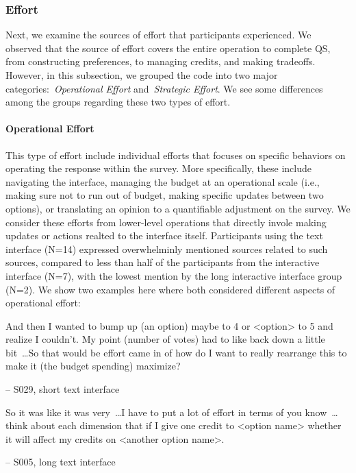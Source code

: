 
\subsubsection{Effort}
Next, we examine the sources of effort that participants experienced. We observed that the source of effort covers the entire operation to complete QS, from constructing preferences, to managing credits, and making tradeoffs. However, in this subsection, we grouped the code into two major categories:~\textit{Operational Effort} and~\textit{Strategic Effort}. We see some differences among the groups regarding these two types of effort.

\paragraph{Operational Effort} This type of effort include individual efforts that focuses on specific behaviors on operating the response within the survey. More specifically, these include navigating the interface, managing the budget at an operational scale (i.e., making sure not to run out of budget, making specific updates between two options), or translating an opinion to a quantifiable adjustment on the survey. We consider these efforts from lower-level operations that directly invole making updates or actions realted to the interface itself. Participants using the text interface (N=14) expressed overwhelminly mentioned sources related to such sources, compared to less than half of the participants from the interactive interface (N=7), with the lowest mention by the long interactive interface group (N=2). We show two examples here where both considered different aspects of operational effort:

\begin{displayquote}
And then I wanted to bump up (an option) maybe to 4 or <option> to 5 and realize I couldn't. My point (number of votes) had to like back down a little bit~\ldots So that would be effort came in of how do I want to really rearrange this to make it (the budget spending) maximize?

\noindent \hfill -- S029, short text interface
\end{displayquote}

\begin{displayquote}
So it was like it was very~\ldots I have to put a lot of effort in terms of you know~\ldots think about each dimension that if I give one credit to <option name> whether it will affect my credits on <another option name>.

\noindent \hfill -- S005, long text interface
\end{displayquote}

